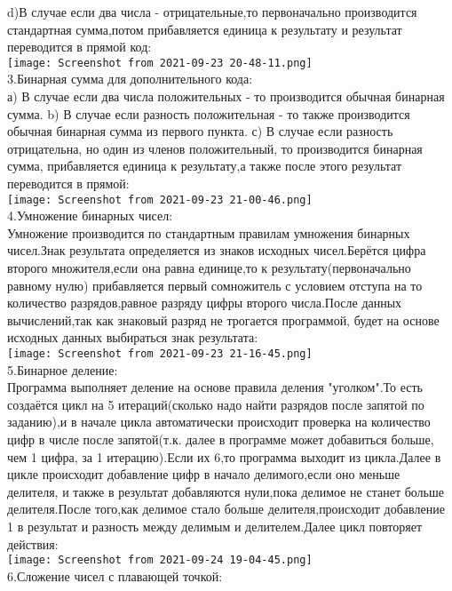 \documentclass[a4paper,11pt]{article}
\begin{document}
\begin{flushleft}
d)В случае если два числа - отрицательные,то первоначально производится стандартная сумма,потом прибавляется единица к результату и результат переводится в прямой код: \\
\texttt{[image: Screenshot from 2021-09-23 20-48-11.png]} \\
3.Бинарная сумма для дополнительного кода: \\
а) В случае если два числа положительных - то производится обычная бинарная сумма.
b) В случае если разность положительная - то также производится обычная бинарная сумма из первого пункта.
с) В случае если разность отрицательна, но один из членов положительный, то производится бинарная сумма, прибавляется единица к результату,а также после этого результат переводится в прямой: \\
\texttt{[image: Screenshot from 2021-09-23 21-00-46.png]} \\
4.Умножение бинарных чисел: \\
Умножение производится по стандартным правилам умножения бинарных чисел.Знак результата определяется из знаков исходных чисел.Берётся цифра второго множителя,если она равна единице,то к результату(первоначально равному нулю) прибавляется первый сомножитель с условием отступа на то количество разрядов,равное разряду цифры второго числа.После данных вычислений,так как знаковый разряд не трогается программой, будет на основе исходных данных выбираться знак результата: \\
\texttt{[image: Screenshot from 2021-09-23 21-16-45.png]} \\
5.Бинарное деление: \\
Программа выполняет деление на основе правила деления "уголком".То есть создаётся цикл на 5 итераций(сколько надо найти разрядов после запятой по заданию),и в начале цикла автоматически происходит проверка на количество цифр в числе после запятой(т.к. далее в программе может добавиться больше, чем 1 цифра, за 1 итерацию).Если их 6,то программа выходит из цикла.Далее в цикле происходит добавление цифр в начало делимого,если оно меньше делителя, и также в результат добавляются нули,пока делимое не станет больше делителя.После того,как делимое стало больше делителя,происходит добавление 1 в результат и разность между делимым и делителем.Далее цикл повторяет действия:\\
\texttt{[image: Screenshot from 2021-09-24 19-04-45.png]} \\
6.Сложение чисел с плавающей точкой: \\

\end{flushleft}
\end{document}
